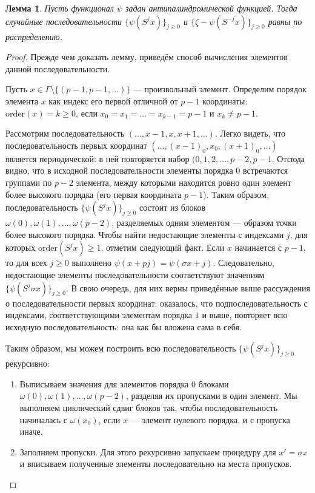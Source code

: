 \documentclass[14pt, a4paper, russian]{report}
\newtheorem{lemma}{\indent Лемма}
\begin{document}
\begin{lemma}
Пусть функционал $\psi$ задан антипалиндромической функцией. Тогда случайные последовательности $\{\psi(S^j x)\}_{j \ge 0}$ и $\{ \zeta - \psi(S^{-j} x)\}_{j \ge 0}$ равны по распределению. 
\end{lemma}
\begin{proof}
Прежде чем доказать лемму, приведём способ вычисления элементов данной последовательности.

Пусть $x \in \Gamma \setminus \{(p-1,p-1,\ldots)\}$ --- произвольный элемент. Определим порядок элемента $x$ как индекс его первой отличной от $p-1$ координаты: $\mathrm{order}(x) = k \ge 0$, если  $x_0=x_1=\ldots=x_{k-1}=p-1$ и $x_k \ne p-1$.

Рассмотрим последовательность $(\ldots, x-1,x,x+1, \ldots)$.  Легко видеть, что последовательность первых координат $(\ldots, (x-1)_0,x_0,(x+1)_0, \ldots)$ является периодической: в ней повторяется набор
$(0, 1, 2, \ldots,p-2, p-1$. Отсюда видно, что в исходной последовательности элементы порядка $0$ встречаются группами по $p-2$ элемента, между которыми находится ровно один элемент более высокого порядка (его первая координата $p-1$). Таким образом, последовательность
$\{\psi(S^j x)\}_{j \ge 0}$ состоит из блоков $\omega(0),\omega(1),\ldots, \omega(p-2)$, разделяемых одним элементом --- образом точки более высокого порядка. Чтобы найти недостающие элементы с индексами $j$, для которых $\mathrm{order}(S^j x) \ge 1$, отметим следующий факт. Если $x$ начинается с $p-1$, то для всех $j \ge 0$ выполнено $\psi(x+pj)=\psi(\sigma x + j)$. Следовательно, недостающие элементы последовательности соответствуют значениям $\{\psi(S^j \sigma x)\}_{j \ge 0}$. В свою очередь, для них верны приведённые выше рассуждения о последовательности первых координат: оказалось, что подпоследовательность с индексами, соответствующими элементам порядка $1$ и выше, повторяет всю исходную последовательность: она как бы вложена сама в себя.

Таким образом, мы можем построить всю последовательность $\{\psi(S^j x)\}_{j \ge 0}$ рекурсивно:
\begin{enumerate}
\item Выписываем значения для элементов порядка $0$ блоками $\omega(0),\omega(1),\ldots, \omega(p-2)$, разделяя их пропусками в один элемент. Мы выполняем циклический сдвиг блоков так, чтобы последовательность начиналась с $\omega(x_0)$, если $x$ --- элемент нулевого порядка, и с пропуска иначе.
\item Заполняем пропуски. Для этого рекурсивно запускаем процедуру для $x' = \sigma x$ и вписываем полученные элементы последовательно на места пропусков.


\end{enumerate}
\end{proof}
\end{document}
